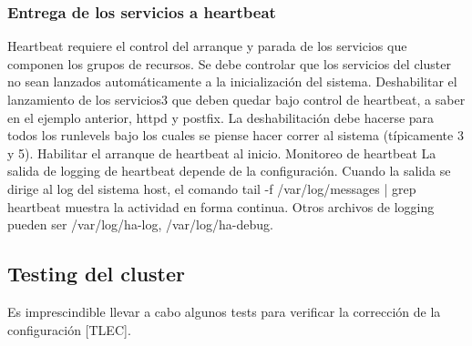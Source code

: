 \subsubsection{Entrega de los servicios a heartbeat}
Heartbeat requiere el control del arranque y parada de los servicios que componen los grupos de recursos. Se debe controlar que los servicios del cluster no sean lanzados automáticamente a la inicialización del sistema. 
Deshabilitar el lanzamiento de los servicios3 que deben quedar bajo control de heartbeat, a saber en el ejemplo anterior, httpd y postfix.
La deshabilitación debe hacerse para todos los runlevels bajo los cuales se piense hacer correr al sistema (típicamente 3 y 5).
Habilitar el arranque de heartbeat al inicio.
Monitoreo de heartbeat
La salida de logging de heartbeat depende de la configuración. Cuando la salida se dirige al log del sistema host, el comando tail -f /var/log/messages | grep heartbeat muestra la actividad en forma continua. Otros archivos de logging pueden ser /var/log/ha-log, /var/log/ha-debug.

\subsection{Testing del cluster}
Es imprescindible llevar a cabo algunos tests para verificar la corrección de la configuración [TLEC].


